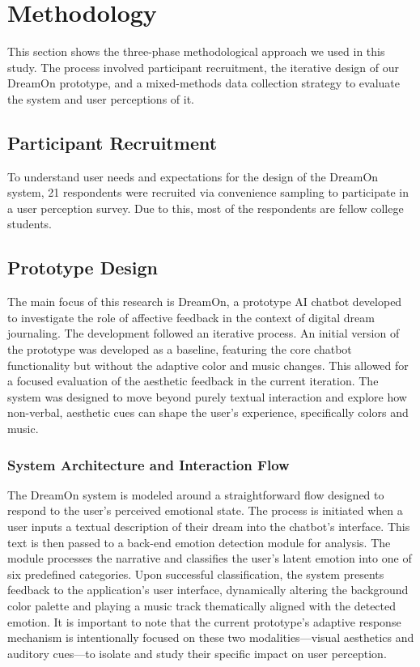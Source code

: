 \documentclass[conference]{IEEEtran}
\begin{document}
	\section{Methodology}
	This section shows the three-phase methodological approach we used in this study. The process involved participant recruitment, the iterative design of our DreamOn prototype, and a mixed-methods data collection strategy to evaluate the system and user perceptions of it.
	
	\subsection{Participant Recruitment}
	To understand user needs and expectations for the design of the DreamOn system, 21 respondents were recruited via convenience sampling to participate in a user perception survey. Due to this, most of the respondents are fellow college students.
	
	\subsection{Prototype Design}
	The main focus of this research is DreamOn, a prototype AI chatbot developed to investigate the role of affective feedback in the context of digital dream journaling. The development followed an iterative process. An initial version of the prototype was developed as a baseline, featuring the core chatbot functionality but without the adaptive color and music changes. This allowed for a focused evaluation of the aesthetic feedback in the current iteration. The system was designed to move beyond purely textual interaction and explore how non-verbal, aesthetic cues can shape the user's experience, specifically colors and music.
	
	\subsubsection{System Architecture and Interaction Flow}
	The DreamOn system is modeled around a straightforward flow designed to respond to the user's perceived emotional state. The process is initiated when a user inputs a textual description of their dream into the chatbot's interface. This text is then passed to a back-end emotion detection module for analysis. The module processes the narrative and classifies the user's latent emotion into one of six predefined categories. Upon successful classification, the system presents feedback to the application's user interface, dynamically altering the background color palette and playing a music track thematically aligned with the detected emotion. It is important to note that the current prototype's adaptive response mechanism is intentionally focused on these two modalities—visual aesthetics and auditory cues—to isolate and study their specific impact on user perception.
	
\end{document}
